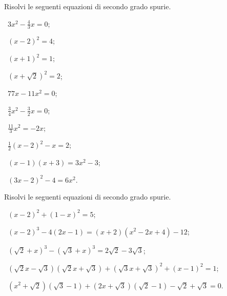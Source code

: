 \begin{esercizio}[\Ast]
 \label{ese:3.7}
Risolvi le seguenti equazioni di secondo grado spurie.
\begin{multicols}{2}
 \begin{enumeratea}
 \item~$3x^{2} - \frac{4}{3} x = 0$;
 \item~$(x - 2)^{2} = 4$;
 \item~$(x + 1)^{2} = 1$;
 \item~$(x + \sqrt{2})^{2} = 2$;
 \item~$77 x - 11 x^{2} = 0$;
 \item~$\frac{3}{4} x^{2} - \frac{3}{2} x = 0$;
 \item~$\frac{11}{3} x^{2} = - 2 x$;
 \item~$\frac{1}{2} ( x - 2 )^{2} - x = 2$;
 \item~$(x - 1) (x + 3) = 3 x^{2} - 3$;
 \item~$(3 x - 2)^{2} - 4 = 6 x^{2}$.
 \end{enumeratea}
 \end{multicols}
\end{esercizio}


\begin{esercizio}[\Ast]
 \label{ese:3.8}
Risolvi le seguenti equazioni di secondo grado spurie.
 \begin{enumeratea}
 \item~$(x - 2)^{2} + (1 - x)^{2} = 5$;
 \item~$(x - 2)^{3} - 4 (2 x - 1) = (x + 2) \left(x^{2} - 2 x + 4\right) - 12$;
 \item~$(\sqrt{2} + x)^{3} - (\sqrt{3} + x)^{3} = 2 \sqrt{2} - 3\sqrt{3}$;
 \item~$(\sqrt{2} x - \sqrt{3}) (\sqrt{2} x + \sqrt{3}) + (\sqrt{3} x + \sqrt{3})^{2} + (x - 1)^{2} = 1$;
 \item~$\left(x^{2} + \sqrt{2} \right) (\sqrt{3} - 1) + (2 x +\sqrt{3}) (\sqrt{2} - 1) - \sqrt{2} + \sqrt{3} = 0$.
 \end{enumeratea}
\end{esercizio}

